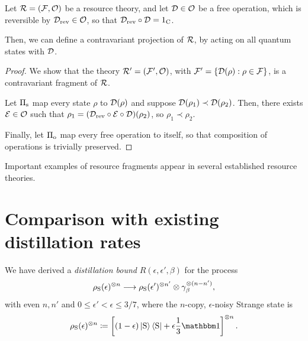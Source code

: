 \documentclass[pra,
aps,
twocolumn,
superscriptaddress,
groupedaddress,
nofootinbib,
reprint
]{revtex4-1}
\begin{document}
\begin{proposition}
	Let ${\mathcal R} = ({\mathcal F},{\mathcal O})$ be a resource theory, and let ${\mathcal D} \in {\mathcal O}$ be a free operation, which is reversible by ${\mathcal D}_{\rm{rev}} \in {\mathcal O}$, so that ${\mathcal D}_{\rm{rev}} \circ {\mathcal D} = 1_{\rm{C}}$.
	
	Then, we can define a contravariant projection of ${\mathcal R}$, by acting on all quantum states with ${\mathcal D}$.
\end{proposition}
\begin{proof}
	We show that the theory ${\mathcal R}' = ({\mathcal F}', {\mathcal O})$, with ${\mathcal F}' = \{{\mathcal D}(\rho):\rho \in {\mathcal F} \}$, is a contravariant fragment of ${\mathcal R}$.
	
	Let $\Pi_{\rm{s}}$ map every state $\rho$ to ${\mathcal D}(\rho)$ and suppose ${\mathcal D}(\rho_1) \prec {\mathcal D}(\rho_2)$. 
	Then, there exists ${\mathcal E} \in {\mathcal O}$ such that $\rho_1 = ({\mathcal D}_{\rm{rev}} \circ {\mathcal E} \circ {\mathcal D}) (\rho_2)$, so $\rho_1 \prec \rho_2$.
	
	Finally, let $\Pi_{\rm{o}}$ map every free operation to itself, so that composition of operations is trivially preserved.
	
 
\end{proof}

Important examples of resource fragments appear in several established resource theories.  


\null\newpage
\section{Comparison with existing distillation rates}
\label{sec:comparison}

We have derived a \emph{distillation bound} $R(\epsilon, \epsilon', \beta)$ for the process
\begin{equation}\label{eq:stdist}
	\rho_{\rm{S}}(\epsilon)^{\otimes n} \longrightarrow \rho_{\rm{S}}(\epsilon')^{\otimes n'} \otimes \gamma_\beta^{\otimes (n-n')},
\end{equation}
with even $n, n'$ and $0 \leq \epsilon' < \epsilon \leq 3/7$, where the $n$-copy, $\epsilon$-noisy Strange state is
\begin{equation}\label{eq:test}
    \rho_{\rm{S}}(\epsilon)^{\otimes n} \coloneqq \left[ (1 - \epsilon) \ket{\rm{S}}\bra{\rm{S}} + \epsilon \frac{1}{3}\id \right]^{\otimes n}.
\end{equation}
\end{document}
